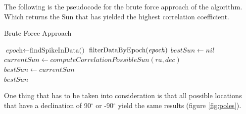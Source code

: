 The following is the pseudocode for the brute force approach of the algorithm. Which returns the Sun that has yielded the highest correlation coefficient.

\begin{algorithm}
	\caption{Brute Force Approach}\label{pseudocodeBruteForce}
	\begin{algorithmic}[1]
		\State $\textit{epoch} \gets \text{findSpikeInData()}$ 
		\State $\text{filterDataByEpoch(\textit{epoch})}$
		\State $bestSun \gets nil$
		\State $currentSun \gets computeCorrelationPossibleSun(ra, dec)$
		\State $bestSun \gets currentSun$
		\EndIf
		\EndFor
		\EndFor
		\\
		\Return $bestSun$
		\EndProcedure
	\end{algorithmic}
\end{algorithm}

\clearpage

One thing that has to be taken into consideration is that all possible locations that have a declination of 90$^{\circ}$ or -90$^{\circ}$ yield the same results (figure \ref{fig:poles}).

